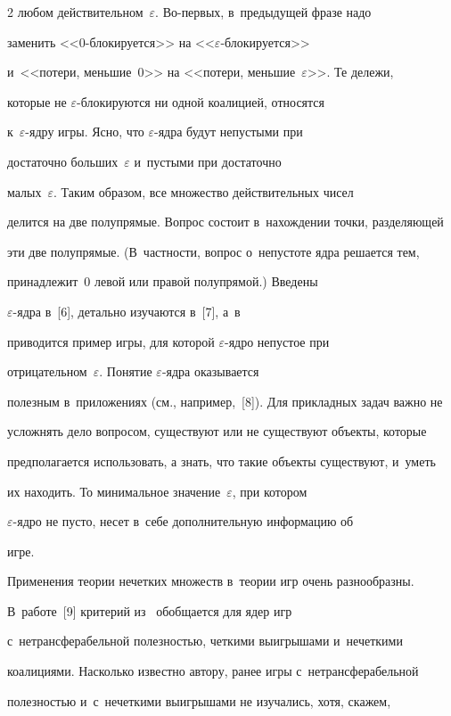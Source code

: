 \begin{multicols}{2}
любом действительном~$\varepsilon$. Во-пер\-вых, в~предыдущей фразе надо 

заменить <<0-бло\-ки\-ру\-ет\-ся>> на <<$\varepsilon$-бло\-ки\-ру\-ет\-ся>> 

и~<<потери, меньшие~0>> на <<потери, меньшие~$\varepsilon$>>. Те дележи, 

которые не $\varepsilon$-бло\-ки\-ру\-ют\-ся ни одной коалицией, относятся 

к~\mbox{$\varepsilon$-яд}\-ру игры. Ясно, что $\varepsilon$-яд\-ра будут непустыми при 

достаточно больших~$\varepsilon$ и~пустыми при достаточно 

малых~$\varepsilon$. Таким образом, все множество действительных чисел 

делится на две полупрямые. Вопрос состоит в~нахождении точки, разделяющей 

эти две полупрямые. (В~частности, вопрос о~непустоте ядра решается тем, 

принадлежит~0 левой или правой полупрямой.) Введены 

$\varepsilon$-яд\-ра в~[6], детально изучаются в~[7], а~в~\cite[с.~307]{7-sh} 

приводится пример игры, для которой $\varepsilon$-яд\-ро непустое при 

отрицательном~$\varepsilon$. Понятие $\varepsilon$-яд\-ра оказывается 

полезным в~приложениях (см., например,~[8]). Для прикладных задач важно не 

усложнять дело вопросом, существуют или не существуют объекты, которые 

предполагается использовать, а знать, что такие объекты существуют, и~уметь 

их находить. То минимальное значение~$\varepsilon$, при котором 

$\varepsilon$-яд\-ро не пусто, несет в~себе дополнительную информацию об 

игре.



     Применения теории нечетких множеств в~теории игр очень разнообразны. 

В~работе~[9] критерий из~\cite{5-sh} обобщается для ядер игр 

с~нетрансферабельной полезностью, четкими выигрышами и~нечеткими 

коалициями. Насколько известно автору, ранее игры с~нетрансферабельной 

полезностью и~с~нечеткими выигрышами не изучались, хотя, скажем, 


\end{multicols}
